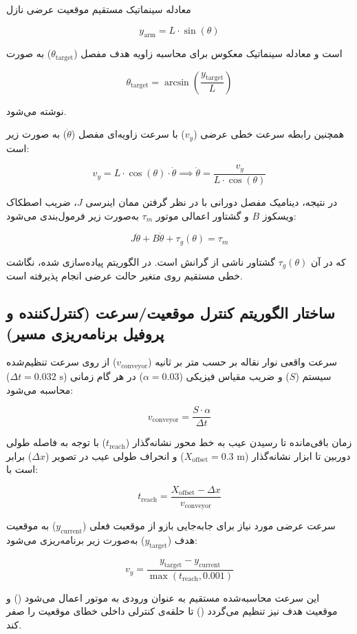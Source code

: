 \documentclass[a4paper, 10pt, twocolumn]{article}
\begin{document}
	معادله سینماتیک مستقیم موقعیت عرضی نازل
	
	
	$$y_{\text{arm}} = L \cdot \sin(\theta)$$
	
	است و معادله سینماتیک معکوس برای محاسبه زاویه هدف مفصل ($\theta_{\text{target}}$) به صورت
	
	
	$$\theta_{\text{target}} = \arcsin\left(\frac{y_{\text{target}}}{L}\right)$$
	
	نوشته می‌شود.
	
	همچنین رابطه سرعت خطی عرضی ($v_y$) با سرعت زاویه‌ای مفصل ($\dot{\theta}$) به صورت زیر است:
	
	$$v_y = L \cdot \cos(\theta) \cdot \dot{\theta} \implies \dot{\theta} = \frac{v_y}{L \cdot \cos(\theta)}$$
	
	در نتیجه، دینامیک مفصل دورانی با در نظر گرفتن ممان اینرسی $J$، ضریب اصطکاک ویسکوز $B$ و گشتاور اعمالی موتور $\tau_m$ به‌صورت زیر فرمول‌بندی می‌شود:
	
	$$J \ddot{\theta} + B \dot{\theta} + \tau_g(\theta) = \tau_m$$
	
	که در آن $\tau_g(\theta)$ گشتاور ناشی از گرانش است. در الگوریتم پیاده‌سازی شده، نگاشت خطی مستقیم روی متغیر حالت عرضی انجام پذیرفته است.
	
	\subsection*{ساختار الگوریتم کنترل موقعیت/سرعت (کنترل‌کننده  و پروفیل برنامه‌ریزی مسیر)}
	سرعت واقعی نوار نقاله بر حسب متر بر ثانیه ($v_{\text{conveyor}}$) از روی سرعت تنظیم‌شده سیستم ($S$) و ضریب مقیاس فیزیکی ($\alpha = 0.03$) در هر گام زمانی ($\Delta t = 0.032 \text{ s}$) محاسبه می‌شود:
	
	
	$$v_{\text{conveyor}} = \frac{S \cdot \alpha}{\Delta t}$$
	
	زمان باقی‌مانده تا رسیدن عیب به خط محور نشانه‌گذار ($t_{\text{reach}}$) با توجه به فاصله طولی دوربین تا ابزار نشانه‌گذار ($X_{\text{offset}} = 0.3 \text{ m}$) و انحراف طولی عیب در تصویر ($\Delta x$) برابر است با:
	
	
	$$t_{\text{reach}} = \frac{X_{\text{offset}} - \Delta x}{v_{\text{conveyor}}}$$
	
	سرعت عرضی مورد نیاز برای جابه‌جایی بازو از موقعیت فعلی ($y_{\text{current}}$) به موقعیت هدف ($y_{\text{target}}$) به‌صورت زیر برنامه‌ریزی می‌شود:
	
	
	$$v_y = \frac{y_{\text{target}} - y_{\text{current}}}{\max(t_{\text{reach}}, 0.001)}$$
	
	این سرعت محاسبه‌شده مستقیم به عنوان ورودی به موتور اعمال می‌شود () و موقعیت هدف نیز تنظیم می‌گردد () تا حلقه‌ی کنترلی  داخلی  خطای موقعیت را صفر کند.
	
\end{document}
